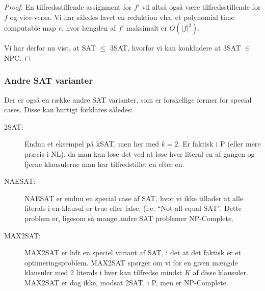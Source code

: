 \begin{proof}
En tilfredsstillende assignment for $f'$ vil altså også være tilfredsstillende for $f$ og vice-versa. Vi har således lavet en reduktion vha. et polynomial time computable map $r$, hvor længden af $f'$ maksimalt er $O(|f|^2)$.

Vi har derfor nu vist, at SAT $\leq$ 3SAT, hvorfor vi kan konkludere at 3SAT $\in$ NPC.
\end{proof}


\subsubsection{Andre SAT varianter}

Der er også en række andre SAT varianter, som er forskellige former for special cases. Disse kan hurtigt forklares således:
\begin{description}
 \item[2SAT:] Endnu et eksempel på kSAT, men her med $k=2$. Er faktisk i P (eller mere præcis i NL), da man kan løse det ved at løse hver literal en af gangen og fjerne klausulerne man har tilfredstillet en efter en.
 \item[NAESAT:] NAESAT er endnu en special case af SAT, hvor vi ikke tillader at alle literals i en klausul er true eller false. (i.e. ``Not-all-equal SAT''. Dette problem er, ligesom så mange andre SAT problemer NP-Complete.
 \item[MAX2SAT:] MAX2SAT er lidt en speciel variant af SAT, i det at det faktisk er et optimeringsproblem. MAX2SAT spørger om vi for en given mængde klausuler med 2 literals i hver kan tilfredse mindst $K$ af disse klausuler. MAX2SAT er dog ikke, modsat 2SAT, i P, men er NP-Complete.
\end{description}
